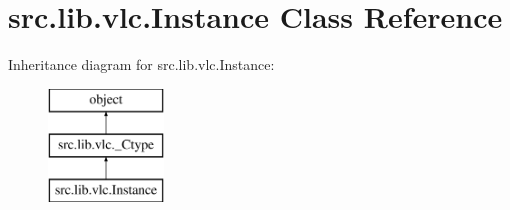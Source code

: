\hypertarget{classsrc_1_1lib_1_1vlc_1_1Instance}{}\section{src.\+lib.\+vlc.\+Instance Class Reference}
\label{classsrc_1_1lib_1_1vlc_1_1Instance}
Inheritance diagram for src.\+lib.\+vlc.\+Instance\+:\begin{figure}[H]
\begin{center}
\leavevmode
\includegraphics[height=3.000000cm]{classsrc_1_1lib_1_1vlc_1_1Instance}
\end{center}
\end{figure}
